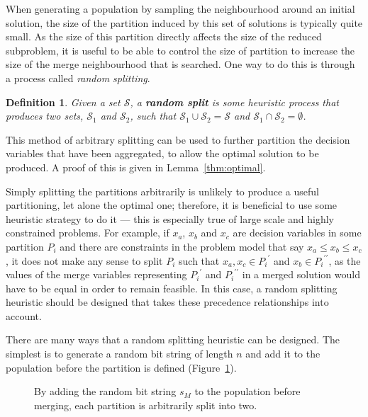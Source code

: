 \documentclass[authoryear,11pt,square,number,times,super,comma]{elsarticle}
\newtheorem{definition}{Definition}
\renewcommand{\S}[1]{\ensuremath{\mathcal{#1}}}
\newcommand{\bemph}[1]{\textbf{\emph{#1}}}
\begin{document}
When generating a population by sampling the neighbourhood around an initial solution, the size of the partition induced by this set of solutions is typically quite small. As the size of this partition directly affects the size of the reduced subproblem, it is useful to be able to control the size of partition to increase the size of the merge neighbourhood that is searched. One way to do this is through a process called \emph{random splitting}. 
%
\begin{definition}\label{def:split}
Given a set $\S{S}$, a \bemph{random split} is some heuristic process that produces two sets, $\S{S}_1$ and $\S{S}_2$, such that $\S{S}_1 \cup \S{S}_2 = \S{S}$ and $\S{S}_1 \cap \S{S}_2 = \emptyset$.
\end{definition}
%
This method of arbitrary splitting can be used to further partition the decision variables that have been aggregated, to allow the optimal solution to be produced. A proof of this is given in Lemma~\ref{thm:optimal}. 

Simply splitting the partitions arbitrarily is unlikely to produce a useful partitioning, let alone the optimal one; therefore, it is beneficial to use some heuristic strategy to do it --- this is especially true of large scale and highly constrained problems. For example, if $x_a$, $x_b$ and $x_c$ are decision variables in some partition $P_i$ and there are constraints in the problem model that say $x_a \leq x_b \leq x_c$, it does not make any sense to split $P_i$ such that $x_a,x_c \in {P_i}^\prime$ and $x_b \in {P_i}^{\prime\prime}$, as the values of the merge variables representing ${P_i}^\prime$ and ${P_i}^{\prime\prime}$ in a merged solution would have to be equal in order to remain feasible. In this case, a random splitting heuristic should be designed that takes these precedence relationships into account.

\medskip

There are many ways that a random splitting heuristic can be designed. The simplest is to generate a random bit string of length $n$ and add it to the population before the partition is defined (Figure~\ref{fig:random_split}). 

\begin{figure}[h]
\centering
{}
\caption[Splitting partitions by adding a random bit string]
       {By adding the random bit string $s_M$ to the population before merging, each partition is arbitrarily split into two.}
\label{fig:random_split}
\end{figure}
\end{document}
